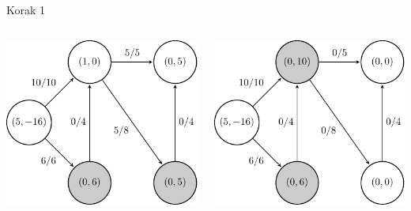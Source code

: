 \documentclass{beamer}
\begin{document}
\begin{frame}{Korak 1}
    \begin{columns}
        \begin{column}{0.5\textwidth}
            \centering
            \includegraphics[scale=0.7]{../writing/images/graf2-3.pdf}
        \end{column}

        \begin{column}{0.5\textwidth}
            \centering
            \includegraphics[scale=0.7]{../writing/images/graf2-2.pdf}
        \end{column}
    \end{columns}
\end{frame}
\end{document}
